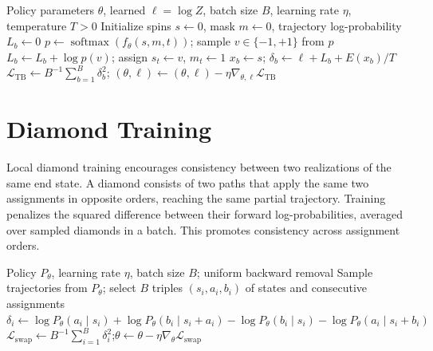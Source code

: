 \documentclass{article}
\begin{document}
\begin{algorithm}[H]\caption{GFlowNet Training with TB}
\begin{algorithmic}[1]\Require Policy parameters $\theta$, learned $\ell=\log Z$, batch size $B$, learning rate $\eta$, temperature $T>0$
        \State 
            Initialize spins $s\gets0$, mask $m\gets0$, trajectory log-probability $L_b\gets0$
            \State 
                $p\gets\operatorname{softmax}(f_\theta(s,m,t))$;
                sample $v\in\{-1,+1\}$ from $p$\State $L_b\gets L_b+\log p(v)$; 
                assign $s_t\gets v$, $m_t\gets1$
            \EndFor\State 
        $x_b\gets s$; 
        $\delta_b\gets\ell+L_b+E(x_b)/T$
        \EndFor\State 
    $\mathcal{L}_{\mathrm{TB}}\gets B^{-1}\sum_{b=1}^{B}\delta_b^2$; $(\theta,\ell)\gets(\theta,\ell)-\eta\nabla_{\theta,\ell}\mathcal{L}_{\mathrm{TB}}$ 
\EndWhile
\end{algorithmic}
\end{algorithm}

\section{}

\section{Diamond Training}
Local diamond training encourages consistency between two realizations of the same end state. A diamond consists of two paths that apply the same two assignments in opposite orders, reaching the same partial trajectory. Training penalizes the squared difference between their forward log-probabilities, averaged over sampled diamonds in a batch. This promotes consistency across assignment orders.

\begin{algorithm}[H]\caption{Diamond Training}\begin{algorithmic}[1]
\Require Policy $P_\theta$, learning rate $\eta$, batch size $B$; uniform backward removal
\State Sample trajectories from $P_\theta$; select $B$ triples $(s_i,a_i,b_i)$ of states and consecutive assignments
\State $\delta_i \gets \log P_\theta(a_i\mid s_i)+\log P_\theta(b_i\mid s_i+a_i)-\log P_\theta(b_i\mid s_i)-\log P_\theta(a_i\mid s_i+b_i)$
\EndFor
\State $\mathcal{L}_{\mathrm{swap}}\gets B^{-1}\sum_{i=1}^{B}\delta_i^2$;\quad $\theta\gets\theta-\eta\nabla_\theta\mathcal{L}_{\mathrm{swap}}$ 
\EndWhile\end{algorithmic}
\end{algorithm}
\end{document}
